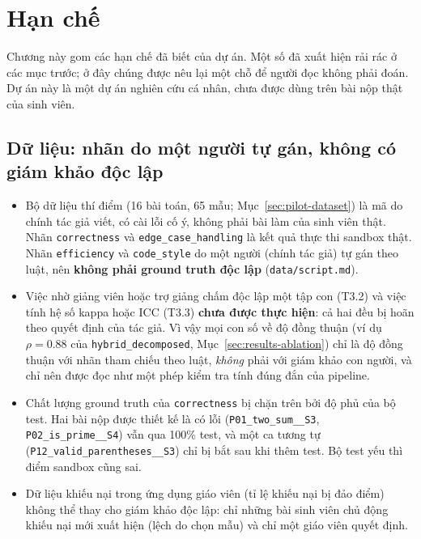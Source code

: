 \documentclass[a4paper,12pt]{report}
\begin{document}
\section{Hạn chế}
\label{sec:limitations}

Chương này gom các hạn chế đã biết của dự án. Một số đã xuất hiện rải rác ở
các mục trước; ở đây chúng được nêu lại một chỗ để người đọc không phải
đoán. Dự án này là một dự án nghiên cứu cá nhân, chưa được dùng trên bài
nộp thật của sinh viên.

\subsection{Dữ liệu: nhãn do một người tự gán, không có giám khảo độc lập}

\begin{itemize}
  \item Bộ dữ liệu thí điểm (16 bài toán, 65 mẫu; Mục~\ref{sec:pilot-dataset})
    là mã do chính tác giả viết, có cài lỗi cố ý, không phải bài làm của
    sinh viên thật. Nhãn \texttt{correctness} và \texttt{edge\_case\_handling}
    là kết quả thực thi sandbox thật. Nhãn \texttt{efficiency} và
    \texttt{code\_style} do một người (chính tác giả) tự gán theo luật, nên
    \textbf{không phải ground truth độc lập} (\texttt{data/script.md}).
  \item Việc nhờ giảng viên hoặc trợ giảng chấm độc lập một tập con (T3.2)
    và việc tính hệ số kappa hoặc ICC (T3.3) \textbf{chưa được thực hiện}: cả
    hai đều bị hoãn theo quyết định của tác giả. Vì vậy mọi con số về độ
    đồng thuận (ví dụ $\rho=0.88$ của \texttt{hybrid\_decomposed},
    Mục~\ref{sec:results-ablation}) chỉ là độ đồng thuận với nhãn tham
    chiếu theo luật, \emph{không} phải với giám khảo con người, và chỉ nên
    được đọc như một phép kiểm tra tính đúng đắn của pipeline.
  \item Chất lượng ground truth của \texttt{correctness} bị chặn trên bởi độ
    phủ của bộ test. Hai bài nộp được thiết kế là có lỗi
    (\texttt{P01\_two\_sum\_\_S3}, \texttt{P02\_is\_prime\_\_S4}) vẫn qua
    100\% test, và một ca tương tự (\texttt{P12\_valid\_parentheses\_\_S3})
    chỉ bị bắt sau khi thêm test. Bộ test yếu thì điểm sandbox cũng sai.
  \item Dữ liệu khiếu nại trong ứng dụng giáo viên (tỉ lệ khiếu nại bị đảo
    điểm) không thể thay cho giám khảo độc lập: chỉ những bài sinh viên chủ
    động khiếu nại mới xuất hiện (lệch do chọn mẫu) và chỉ một giáo viên
    quyết định.
\end{itemize}
\end{document}
